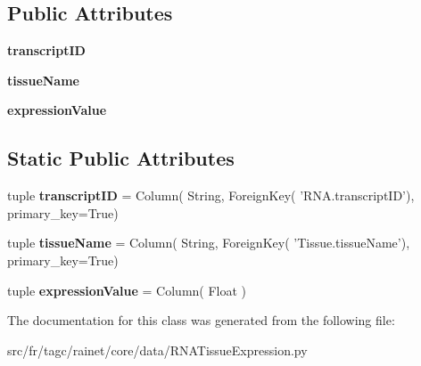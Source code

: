 \subsection*{Public Attributes}
\begin{DoxyCompactItemize}
\item 
\hypertarget{classsrc_1_1fr_1_1tagc_1_1rainet_1_1core_1_1data_1_1RNATissueExpression_1_1RNATissueExpression_a7f7f30643f2935d467b1b9686ed53fab}{{\bfseries transcript\-I\-D}}\label{classsrc_1_1fr_1_1tagc_1_1rainet_1_1core_1_1data_1_1RNATissueExpression_1_1RNATissueExpression_a7f7f30643f2935d467b1b9686ed53fab}

\item 
\hypertarget{classsrc_1_1fr_1_1tagc_1_1rainet_1_1core_1_1data_1_1RNATissueExpression_1_1RNATissueExpression_a4aac27c54bc2f53644c05a4e05b64abe}{{\bfseries tissue\-Name}}\label{classsrc_1_1fr_1_1tagc_1_1rainet_1_1core_1_1data_1_1RNATissueExpression_1_1RNATissueExpression_a4aac27c54bc2f53644c05a4e05b64abe}

\item 
\hypertarget{classsrc_1_1fr_1_1tagc_1_1rainet_1_1core_1_1data_1_1RNATissueExpression_1_1RNATissueExpression_aaaeb6baff39913022456386d4438c9bd}{{\bfseries expression\-Value}}\label{classsrc_1_1fr_1_1tagc_1_1rainet_1_1core_1_1data_1_1RNATissueExpression_1_1RNATissueExpression_aaaeb6baff39913022456386d4438c9bd}

\end{DoxyCompactItemize}
\subsection*{Static Public Attributes}
\begin{DoxyCompactItemize}
\item 
\hypertarget{classsrc_1_1fr_1_1tagc_1_1rainet_1_1core_1_1data_1_1RNATissueExpression_1_1RNATissueExpression_a0ffa69f082a63b619d3fe387e8200648}{tuple {\bfseries transcript\-I\-D} = Column( String, Foreign\-Key( 'R\-N\-A.\-transcript\-I\-D'), primary\-\_\-key=True)}\label{classsrc_1_1fr_1_1tagc_1_1rainet_1_1core_1_1data_1_1RNATissueExpression_1_1RNATissueExpression_a0ffa69f082a63b619d3fe387e8200648}

\item 
\hypertarget{classsrc_1_1fr_1_1tagc_1_1rainet_1_1core_1_1data_1_1RNATissueExpression_1_1RNATissueExpression_a7d49d9237f41ab529b3350b64a50d6e3}{tuple {\bfseries tissue\-Name} = Column( String, Foreign\-Key( 'Tissue.\-tissue\-Name'), primary\-\_\-key=True)}\label{classsrc_1_1fr_1_1tagc_1_1rainet_1_1core_1_1data_1_1RNATissueExpression_1_1RNATissueExpression_a7d49d9237f41ab529b3350b64a50d6e3}

\item 
\hypertarget{classsrc_1_1fr_1_1tagc_1_1rainet_1_1core_1_1data_1_1RNATissueExpression_1_1RNATissueExpression_a026128f4851afabab5e6fa0807e1da99}{tuple {\bfseries expression\-Value} = Column( Float )}\label{classsrc_1_1fr_1_1tagc_1_1rainet_1_1core_1_1data_1_1RNATissueExpression_1_1RNATissueExpression_a026128f4851afabab5e6fa0807e1da99}

\end{DoxyCompactItemize}


The documentation for this class was generated from the following file\-:\begin{DoxyCompactItemize}
\item 
src/fr/tagc/rainet/core/data/R\-N\-A\-Tissue\-Expression.\-py\end{DoxyCompactItemize}
